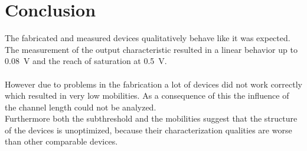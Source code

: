 \documentclass[%
 reprint,
amsmath,amssymb,
pra,
]{revtex4-1}
\begin{document}
\section{Conclusion}
The fabricated and measured devices qualitatively behave like it was expected. The measurement of the output characteristic resulted in a linear behavior up to \SI{0.08}{V} and the reach of saturation at \SI{0.5}{V}.\\
\\
However due to problems in the fabrication a lot of devices did not work correctly which resulted in very low mobilities. As a consequence of this the influence of the channel length could not be analyzed.\\
Furthermore both the subthreshold and the mobilities suggest that the structure of the devices is unoptimized, because their characterization qualities are worse than other comparable devices.


\end{document}
